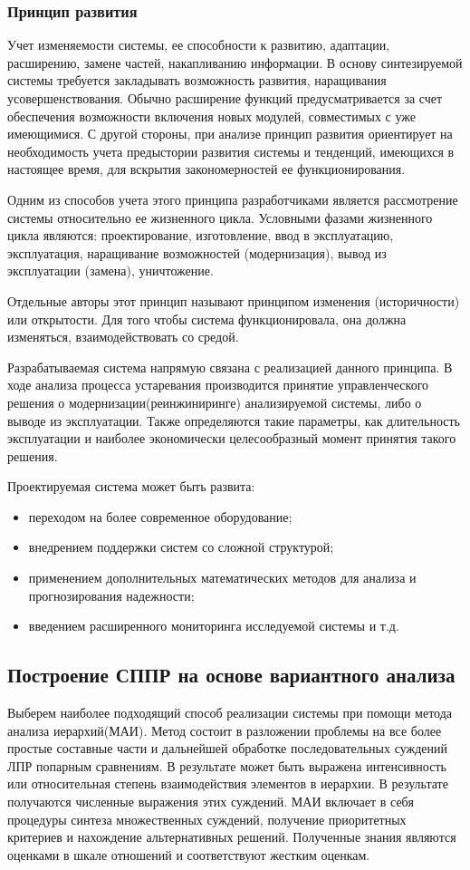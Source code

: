 \subsubsection{Принцип развития}

Учет изменяемости системы, ее способности к развитию, адаптации, расширению, замене частей, накапливанию информации. 
В основу синтезируемой системы требуется закладывать возможность развития, наращивания усовершенствования. 
Обычно расширение функций предусматривается за счет обеспечения возможности включения новых модулей, совместимых с уже имеющимися. 
С другой стороны, при анализе принцип развития ориентирует на необходимость учета предыстории развития системы и тенденций, имеющихся в настоящее время, для вскрытия закономерностей ее функционирования.

Одним из способов учета этого принципа разработчиками является рассмотрение системы относительно ее жизненного цикла. 
Условными фазами жизненного цикла являются: проектирование, изготовление, ввод в эксплуатацию, эксплуатация, наращивание возможностей (модернизация), вывод из эксплуатации (замена), уничтожение.

Отдельные авторы этот принцип называют принципом изменения (историчности) или открытости. 
Для того чтобы система функционировала, она должна изменяться, взаимодействовать со средой.

Разрабатываемая система напрямую связана с реализацией данного принципа. 
В ходе анализа процесса устаревания производится принятие управленческого решения о модернизации(реинжиниринге) анализируемой системы, либо о выводе из эксплуатации. 
Также определяются такие параметры, как длительность эксплуатации и наиболее экономически целесообразный момент принятия такого решения. 

Проектируемая система может быть развита:
\begin{itemize}
    \item переходом на более современное оборудование;
    \item внедрением поддержки систем со сложной структурой;
    \item применением дополнительных математических методов для анализа и прогнозирования надежности;
    \item введением расширенного мониторинга исследуемой системы и т.д.
\end{itemize}

\subsection{Построение СППР на основе вариантного анализа}
Выберем наиболее подходящий способ реализации системы при помощи метода анализа иерархий(МАИ). 
Метод состоит в разложении проблемы на все более простые составные части и дальнейшей обработке последовательных суждений ЛПР попарным сравнениям. 
В результате может быть выражена интенсивность или относительная степень взаимодействия элементов в иерархии. 
В результате получаются численные выражения этих суждений. 
МАИ \cite{var-analyz} включает в себя процедуры синтеза множественных суждений, получение приоритетных критериев и нахождение альтернативных решений. 
Полученные знания являются оценками в шкале отношений и соответствуют жестким оценкам. 

